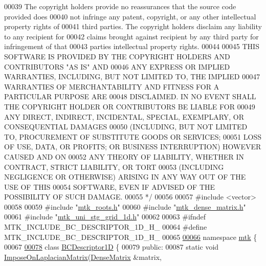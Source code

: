 \begin{DoxyCode}
00039 \textcolor{comment}{The copyright holders provide no reassurances that the source code provided does}
00040 \textcolor{comment}{not infringe any patent, copyright, or any other intellectual property rights of}
00041 \textcolor{comment}{third parties. The copyright holders disclaim any liability to any recipient for}
00042 \textcolor{comment}{claims brought against recipient by any third party for infringement of that}
00043 \textcolor{comment}{parties intellectual property rights.}
00044 \textcolor{comment}{}
00045 \textcolor{comment}{THIS SOFTWARE IS PROVIDED BY THE COPYRIGHT HOLDERS AND CONTRIBUTORS "AS IS" AND}
00046 \textcolor{comment}{ANY EXPRESS OR IMPLIED WARRANTIES, INCLUDING, BUT NOT LIMITED TO, THE IMPLIED}
00047 \textcolor{comment}{WARRANTIES OF MERCHANTABILITY AND FITNESS FOR A PARTICULAR PURPOSE ARE}
00048 \textcolor{comment}{DISCLAIMED. IN NO EVENT SHALL THE COPYRIGHT HOLDER OR CONTRIBUTORS BE LIABLE FOR}
00049 \textcolor{comment}{ANY DIRECT, INDIRECT, INCIDENTAL, SPECIAL, EXEMPLARY, OR CONSEQUENTIAL DAMAGES}
00050 \textcolor{comment}{(INCLUDING, BUT NOT LIMITED TO, PROCUREMENT OF SUBSTITUTE GOODS OR SERVICES;}
00051 \textcolor{comment}{LOSS OF USE, DATA, OR PROFITS; OR BUSINESS INTERRUPTION) HOWEVER CAUSED AND ON}
00052 \textcolor{comment}{ANY THEORY OF LIABILITY, WHETHER IN CONTRACT, STRICT LIABILITY, OR TORT}
00053 \textcolor{comment}{(INCLUDING NEGLIGENCE OR OTHERWISE) ARISING IN ANY WAY OUT OF THE USE OF THIS}
00054 \textcolor{comment}{SOFTWARE, EVEN IF ADVISED OF THE POSSIBILITY OF SUCH DAMAGE.}
00055 \textcolor{comment}{*/}
00056 
00057 \textcolor{preprocessor}{#include <vector>}
00058 
00059 \textcolor{preprocessor}{#include "\hyperlink{mtk__roots_8h}{mtk\_roots.h}"}
00060 \textcolor{preprocessor}{#include "\hyperlink{mtk__dense__matrix_8h}{mtk\_dense\_matrix.h}"}
00061 \textcolor{preprocessor}{#include "\hyperlink{mtk__uni__stg__grid__1d_8h}{mtk\_uni\_stg\_grid\_1d.h}"}
00062 
00063 \textcolor{preprocessor}{#ifndef MTK\_INCLUDE\_BC\_DESCRIPTOR\_1D\_H\_}
00064 \textcolor{preprocessor}{#define MTK\_INCLUDE\_BC\_DESCRIPTOR\_1D\_H\_}
00065 
\hypertarget{mtk__bc__descriptor__1d_8h_source_l00066}{}\hyperlink{namespacemtk}{00066} \textcolor{keyword}{namespace }\hyperlink{namespacemtk}{mtk} \{
00067 
\hypertarget{mtk__bc__descriptor__1d_8h_source_l00078}{}\hyperlink{classmtk_1_1BCDescriptor1D}{00078} \textcolor{keyword}{class }\hyperlink{classmtk_1_1BCDescriptor1D}{BCDescriptor1D} \{
00079  \textcolor{keyword}{public}:
00087   \textcolor{keyword}{static} \textcolor{keywordtype}{void} \hyperlink{classmtk_1_1BCDescriptor1D_a33e51235eaa930e4470f027001a023cf}{ImposeOnLaplacianMatrix}(\hyperlink{classmtk_1_1DenseMatrix}{DenseMatrix} &matrix,

\end{DoxyCode}
